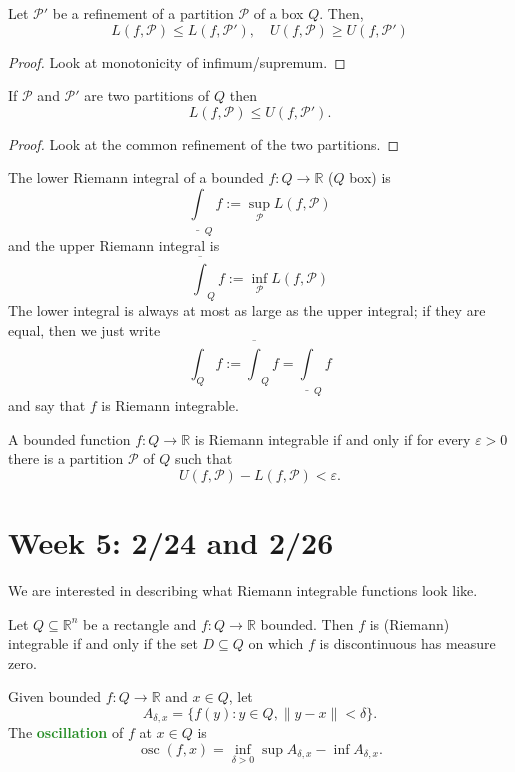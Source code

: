 \documentclass[10pt]{scrartcl}
\providecommand{\ol}{\overline}
\providecommand{\eps}{\varepsilon}
\providecommand{\RR}{\mathbb R}
\providecommand{\opname}{\operatorname}
\providecommand{\vocab}[1]{{\textbf{\textcolor{ForestGreen}{#1}}}}
\begin{document}
\begin{lemma}
	Let $\mathcal P'$ be a refinement of a partition $\mathcal P$
	of a box $Q$. Then,
	\[L(f, \mathcal P)\le L(f, \mathcal P'),\quad
	U(f, \mathcal P)\ge U(f, \mathcal P')\]
\end{lemma}

\begin{proof}
	Look at monotonicity of infimum/supremum.
\end{proof}

\begin{lemma}
	If $\mathcal P$ and $\mathcal P'$ are two partitions of $Q$ then
	\[L(f,\mathcal P)\le U(f, \mathcal P').\]
\end{lemma}

\begin{proof}
	Look at the common refinement of the two partitions.
\end{proof}

\begin{definition}
	The lower Riemann integral of a bounded $f\colon Q\to\RR$ ($Q$ box) is
	\[\underline{\int}_Q f := \sup_{\mathcal P} L(f, \mathcal P)\]
	and the upper Riemann integral is
	\[\overline{\int}_Q f := \inf_{\mathcal P} L(f, \mathcal P)\]
	The lower integral is always at most as large as the upper integral;
	if they are equal, then we just write
	\[\int_Q f := \ol{\int}_Q f = \underline\int_Qf\]
	and say that $f$ is Riemann integrable.
\end{definition}

\begin{lemma}
	A bounded function $f\colon Q\to\RR$ is Riemann integrable if and only if
	for every $\eps > 0$ there is a partition $\mathcal P$ of $Q$ such that
	\[U(f,\mathcal P) - L(f, \mathcal P) < \eps.\]
\end{lemma}

\section{Week 5: 2/24 and 2/26}

We are interested in describing what Riemann integrable functions look like.
\begin{theorem}
	Let $Q\subseteq\RR^n$ be a rectangle and $f\colon Q\to\RR$ bounded.
	Then $f$ is (Riemann) integrable if and only if
	the set $D\subseteq Q$ on which $f$ is discontinuous has measure zero.
\end{theorem}

Given bounded $f\colon Q\to\RR$ and $x\in Q$, let
\[A_{\delta,x} = \{f(y) : y\in Q, \|y-x\|<\delta\}.\]
The \vocab{oscillation} of $f$ at $x\in Q$ is
\[\opname{osc}(f,x) = \inf_{\delta>0} \sup A_{\delta,x} - \inf A_{\delta,x}.\]
\end{document}
